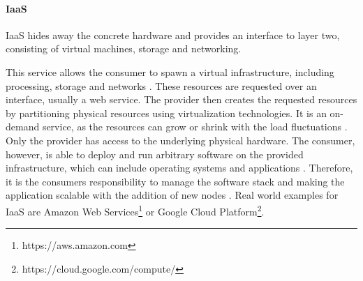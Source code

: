 \paragraph{\acl{IaaS}} 
\ac{IaaS} hides away the concrete hardware and provides an interface to layer two, consisting of virtual machines, storage and networking.

This service allows the consumer to spawn a virtual infrastructure, including processing, storage and networks \citep[p. 3]{DefCC2011}.
These resources are requested over an interface, usually a web service.
The provider then creates the requested resources by partitioning physical resources using virtualization technologies.
It is an on-demand service, as the resources can grow or shrink with the load fluctuations \citep[p. 9]{Zhang2010}.
Only the provider has access to the underlying physical hardware.
The consumer, however, is able to deploy and run arbitrary software on the provided infrastructure, which can include operating systems and applications \citep[p. 3]{DefCC2011}.
Therefore, it is the consumers responsibility to manage the software stack and making the application scalable with the addition of new nodes \citep[p. 79]{Teixeira2014}.
Real world examples for \ac{IaaS} are Amazon Web Services\footnote{https://aws.amazon.com} or Google Cloud Platform\footnote{https://cloud.google.com/compute/}.